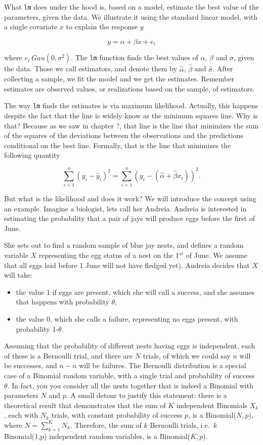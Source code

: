 \documentclass[
]{book}
\providecommand{\tightlist}{%
  \setlength{\itemsep}{0pt}\setlength{\parskip}{0pt}}
\begin{document}
What \texttt{lm} does under the hood is, based on a model, estimate the best value of the parameters, given the data. We illustrate it using the standard linear model, with a single covariate \(x\) to explain the response \(y\)

\[y=\alpha+\beta x+e_i\]

where \(e_i~Gau(0,\sigma^2)\). The \texttt{lm} function finds the best values of \(\alpha\), \(\beta\) and \(\sigma\), given the data. Those we call estimators, and denote them by \(\hat \alpha\), \(\hat \beta\) and \(\hat \sigma\). After collecting a sample, we fit the model and we get the estimates. Remember estimates are observed values, or realizations based on the sample, of estimators.

The way \texttt{lm} finds the estimates is via maximum likelihood. Actually, this happens despite the fact that the line is widely know as the minimum squares line. Why is that? Because as we saw in chapter ?, that line is the line that minimizes the sum of the squares of the deviations between the observations and the predictions conditional on the best line. Formally, that is the line that minimizes the following quantity

\[\sum_{i=1}^n (y_i-\hat y_i)^2=\sum_{i=1}^n (y_i-(\hat \alpha+ \hat \beta x_i))^2.\]

But what is the likelihood and does it work? We will introduce the concept using an example. Imagine a biologist, lets call her Andreia. Andreia is interested in estimating the probability that a pair of jays will produce eggs before the first of June.

She sets out to find a random sample of blue jay nests, and defines a random variable \(X\) representing the egg status of a nest on the 1\(^{st}\) of June. We assume that all eggs laid before 1 June will not have fledged yet). Andreia decides that \(X\) will take:

\begin{itemize}
\tightlist
\item
  the value 1 if eggs are present, which she will call a success, and she assumes that happens with probability \(\theta\),
\item
  the value 0, which she calls a failure, representing no eggs present, with probability 1-\(\theta\).
\end{itemize}

Assuming that the probability of different nests having eggs is independent, each of these is a Bernoulli trial, and there are \(N\) trials, of which we could say \(n\) will be successes, and \(n-n\) will be failures. The Bernoulli distribution is a special case of a Binomial random variable, with a single trial and probability of success \(\theta\). In fact, you you consider all the nests together that is indeed a Binomial with parameters \(N\) and \(p\). A small detour to justify this statement: there is a theoretical result that demonstrates that the sum of \(K\) independent Binomials \(X_k\), each with \(N_k\) trials, with constant probability of success \(p\), is a Binomial(\(N,p\)), where \(N=\sum_{k=1}^K N_k\). Therefore, the sum of \(k\) Bernoulli trials, i.e.~\(k\) Binomial(1,p) independent random variables, is a Binomial(\(K,p\)).
\end{document}
